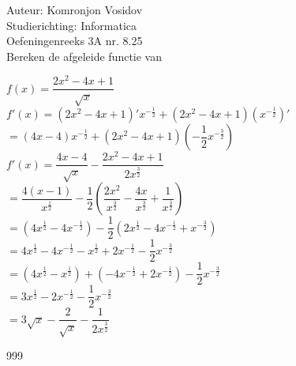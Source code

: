 \documentclass[a4paper]{article}
\begin{document}
	
	\noindent \large Auteur: Komronjon Vosidov \\
	\noindent \large Studierichting: Informatica\\
	\noindent \large Oefeningenreeks 3A nr. 8.25\\
	
	
	
	\normalsize
	Bereken de afgeleide functie van
	
	$f(x) = \dfrac{2x^2 - 4x + 1}{\sqrt{x}}$\\
	
	$f'(x) = \left( 2x^2 - 4x + 1 \right)' x^{-\tfrac{1}{2}} + \left( 2x^2 - 4x + 1 \right) \left(x^{-\tfrac{1}{2}}\right)'$\\
	
	 $= (4x - 4) x^{-\tfrac{1}{2}} + (2x^2 - 4x + 1) \left(-\dfrac{1}{2} x^{-\tfrac{3}{2}} \right)$\\
			
	$ f'(x) = \dfrac{4x-4}{\sqrt{x}} - \dfrac{2x^2 - 4x + 1}{2x^{\tfrac{3}{2}}} $\\ 
	
	$ = \dfrac{4(x-1)}{x^{\tfrac{1}{2}}} - \dfrac{1}{2} \left( \dfrac{2x^2}{x^{\tfrac{3}{2}}} - \dfrac{4x}{x^{\tfrac{3}{2}}} + \dfrac{1}{x^{\tfrac{3}{2}}} \right) $\\
	
	$ = \left( 4x^{\tfrac{1}{2}} - 4x^{-\tfrac{1}{2}} \right) - \dfrac{1}{2} \left( 2x^{\tfrac{1}{2}} - 4x^{-\tfrac{1}{2}} + x^{-\tfrac{3}{2}} \right) $\\
	
	$ = 4x^{\tfrac{1}{2}} - 4x^{-\tfrac{1}{2}} - x^{\tfrac{1}{2}} + 2x^{-\tfrac{1}{2}} - \dfrac{1}{2} x^{-\tfrac{3}{2}} $\\
	
	$ = (4x^{\tfrac{1}{2}} - x^{\tfrac{1}{2}}) + (-4x^{-\tfrac{1}{2}} + 2x^{-\tfrac{1}{2}}) - \dfrac{1}{2} x^{-\tfrac{3}{2}} $\\
	
	$ = 3x^{\tfrac{1}{2}} - 2x^{-\tfrac{1}{2}} - \dfrac{1}{2} x^{-\tfrac{3}{2}} $\\  
	
	$ = 3\sqrt{x} - \dfrac{2}{\sqrt{x}} - \dfrac{1}{2x^{\tfrac{3}{2}}} $
	
	

	
	
	\begin{thebibliography}{999}
	\end{thebibliography}	
	
\end{document}
